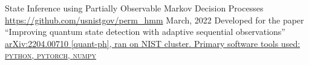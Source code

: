 

\begin{cventries}

  \cventry
    {State Inference using Partially Observable Markov Decision Processes} %
    {\href{https://github.com/usnistgov/perm\_hmm}{https://github.com/usnistgov/perm\_hmm}} %
    {} %
    {March, 2022} %
    {Developed for the paper ``Improving quantum state detection with adaptive sequential observations'' \href{https://doi.org/10.48550/arXiv.2204.00710}{arXiv:2204.00710 [quant-ph], ran on NIST cluster. Primary software tools used: \textsc{python}, \textsc{pytorch}, \textsc{numpy}}
}

\end{cventries}
